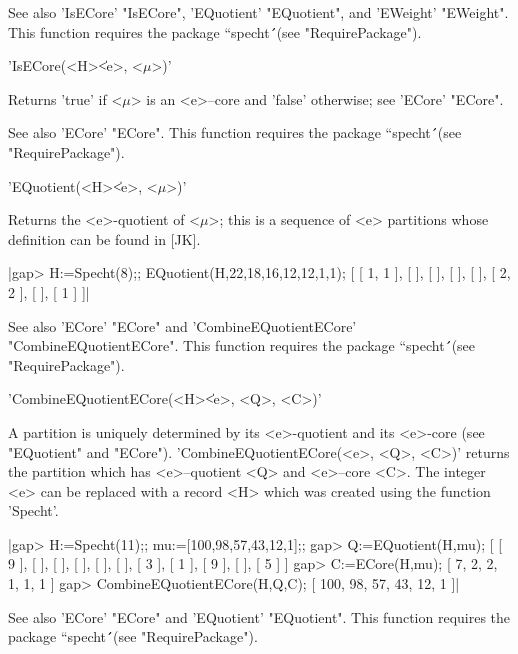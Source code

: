 See also 'IsECore' "IsECore", 'EQuotient' "EQuotient", and 'EWeight' 
"EWeight".  This function requires the package ``specht\'\'\ (see 
"RequirePackage").



'IsECore(<H>\|<e>, <$\mu$>)'

Returns 'true' if <$\mu$> is an <e>--core and 'false' otherwise; see 
'ECore' "ECore".

See also 'ECore' "ECore". This function requires the package ``specht\'\'\ 
(see "RequirePackage").



'EQuotient(<H>\|<e>, <$\mu$>)'

Returns the <e>-quotient of <$\mu$>; this is a sequence of <e> partitions
whose definition can be found in [JK]. 

|gap> H:=Specht(8);; EQuotient(H,22,18,16,12,12,1,1);
[ [ 1, 1 ], [  ], [  ], [  ], [  ], [ 2, 2 ], [  ], [ 1 ] ]|

See also 'ECore' "ECore" and 'CombineEQuotientECore' "CombineEQuotientECore".
This function requires the package ``specht\'\'\ (see "RequirePackage").



'CombineEQuotientECore(<H>\|<e>, <Q>, <C>)'

A partition is uniquely determined by its <e>-quotient and its <e>-core 
(see "EQuotient" and "ECore"). 'CombineEQuotientECore(<e>, <Q>, <C>)' returns 
the partition which has <e>--quotient <Q> and <e>--core <C>. The integer
<e> can be replaced with a record <H> which was created using the function
'Specht'.

|gap> H:=Specht(11);; mu:=[100,98,57,43,12,1];;
gap> Q:=EQuotient(H,mu);
[ [ 9 ], [  ], [  ], [  ], [  ], [  ], [ 3 ], [ 1 ], [ 9 ], [  ], [ 5 ] ]
gap> C:=ECore(H,mu);
[ 7, 2, 2, 1, 1, 1 ]
gap> CombineEQuotientECore(H,Q,C);
[ 100, 98, 57, 43, 12, 1 ]|

See also 'ECore' "ECore" and  'EQuotient' "EQuotient".  This function 
requires the package ``specht\'\'\ (see "RequirePackage").


